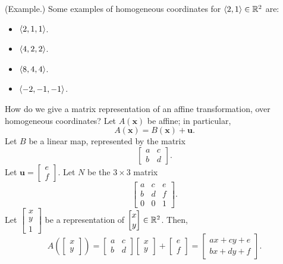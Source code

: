 \documentclass[letterpaper]{article}
\begin{document}
\begin{mdframed}[]
    (Example.) Some examples of homogeneous coordinates for $\langle 2, 1 \rangle \in \mathbb{R}^2$ are: 
    \begin{itemize}
        \item $\langle 2, 1, 1 \rangle$. 
        \item $\langle 4, 2, 2 \rangle$. 
        \item $\langle 8, 4, 4 \rangle$. 
        \item $\langle -2, -1, -1 \rangle$. 
    \end{itemize}
\end{mdframed}
How do we give a matrix representation of an affine transformation, over homogeneous coordinates? Let $A(\mathbf{x})$ be affine; in particular,
\[A(\mathbf{x}) = B(\mathbf{x}) + \mathbf{u}.\]
Let $B$ be a linear map, represented by the matrix 
\[\begin{bmatrix}
    a & c \\ b & d
\end{bmatrix}.\]
Let $\mathbf{u} = \begin{bmatrix}
    e \\ f
\end{bmatrix}$. Let $N$ be the $3 \times 3$ matrix 
\[\begin{bmatrix}
    a & c & e \\
    b & d & f \\ 
    0 & 0 & 1
\end{bmatrix}.\]
Let $\begin{bmatrix}
    x \\ y \\ 1
\end{bmatrix}$ be a representation of $\begin{bmatrix}
    x \\ y
\end{bmatrix} \in \mathbb{R}^2$. Then,
\[A\left(\begin{bmatrix}
    x \\ y
\end{bmatrix}\right) = \begin{bmatrix}
    a & c \\ 
    b & d
\end{bmatrix} \begin{bmatrix}
    x \\ y
\end{bmatrix} + \begin{bmatrix}
    e \\ f
\end{bmatrix} = \begin{bmatrix}
    ax + cy + e \\ 
    bx + dy + f
\end{bmatrix}.\]
\end{document}
